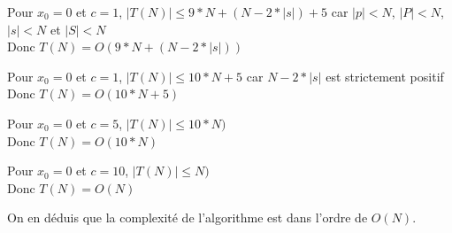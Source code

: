 Pour $x_0 = 0$ et $c = 1$, $|T(N)| \leq 9 * N + (N - 2 * |s|) + 5$ car $|p| < N$, $|P| < N$, $|s| < N$ et $|S| < N$ \\
Donc $T(N) = O(9 * N + (N - 2 * |s|))$

\vspace{5mm}

Pour $x_0 = 0$ et $c = 1$, $|T(N)| \leq 10 * N + 5$ car $N - 2 * |s|$ est strictement positif \\
Donc $T(N) = O(10 * N + 5)$

\vspace{5mm}

Pour $x_0 = 0$ et $c = 5$, $|T(N)| \leq 10 * N)$ \\
Donc $T(N) = O(10 * N)$

\vspace{5mm}

Pour $x_0 = 0$ et $c = 10$, $|T(N)| \leq N)$ \\
Donc $T(N) = O(N)$

\vspace{5mm}

On en déduis que la complexité de l'algorithme est dans l'ordre de $O(N)$.
